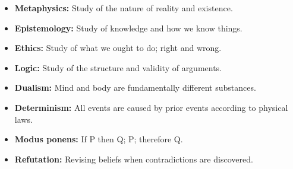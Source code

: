 \begin{defbox}
\begin{itemize}
  \item \textbf{Metaphysics:} Study of the nature of reality and existence.
  \item \textbf{Epistemology:} Study of knowledge and how we know things.
  \item \textbf{Ethics:} Study of what we ought to do; right and wrong.
  \item \textbf{Logic:} Study of the structure and validity of arguments.
  \item \textbf{Dualism:} Mind and body are fundamentally different substances.
  \item \textbf{Determinism:} All events are caused by prior events according to physical laws.
  \item \textbf{Modus ponens:} If P then Q; P; therefore Q.
  \item \textbf{Refutation:} Revising beliefs when contradictions are discovered.
\end{itemize}
\end{defbox}

